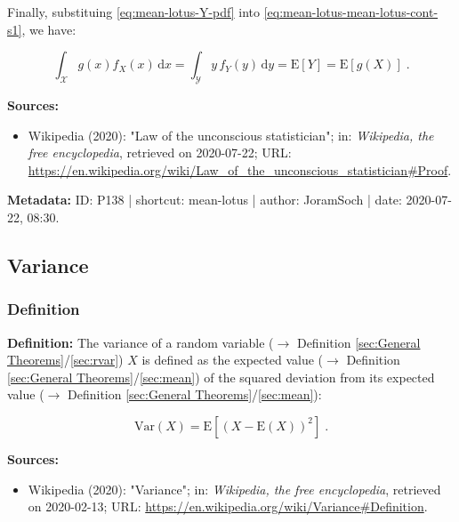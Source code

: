 \documentclass[a4paper,12pt,twoside]{book}
\begin{document}
Finally, substituing \eqref{eq:mean-lotus-Y-pdf} into \eqref{eq:mean-lotus-mean-lotus-cont-s1}, we have:

\begin{equation} \label{eq:mean-lotus-mean-lotus-cont-s2}
\int_{\mathcal{X}} g(x) f_X(x) \, \mathrm{d}x = \int_{\mathcal{Y}} y \, f_Y(y) \, \mathrm{d}y = \mathrm{E}[Y] = \mathrm{E}[g(X)] \; .
\end{equation}


\vspace{1em}
\textbf{Sources:}
\begin{itemize}
\item Wikipedia (2020): "Law of the unconscious statistician"; in: \textit{Wikipedia, the free encyclopedia}, retrieved on 2020-07-22; URL: \url{https://en.wikipedia.org/wiki/Law_of_the_unconscious_statistician#Proof}.
\end{itemize}


\vspace{1em}
\textbf{Metadata:} ID: P138 | shortcut: mean-lotus | author: JoramSoch | date: 2020-07-22, 08:30.
\vspace{1em}



\subsection{Variance}

\subsubsection[\textit{Definition}]{Definition} \label{sec:var}
\setcounter{equation}{0}

\textbf{Definition:} The variance of a random variable ($\rightarrow$ Definition \ref{sec:General Theorems}/\ref{sec:rvar}) $X$ is defined as the expected value ($\rightarrow$ Definition \ref{sec:General Theorems}/\ref{sec:mean}) of the squared deviation from its expected value ($\rightarrow$ Definition \ref{sec:General Theorems}/\ref{sec:mean}):

\begin{equation} \label{eq:var-var}
\mathrm{Var}(X) = \mathrm{E}\left[ (X-\mathrm{E}(X))^2 \right] \; .
\end{equation}


\vspace{1em}
\textbf{Sources:}
\begin{itemize}
\item Wikipedia (2020): "Variance"; in: \textit{Wikipedia, the free encyclopedia}, retrieved on 2020-02-13; URL: \url{https://en.wikipedia.org/wiki/Variance#Definition}.
\end{itemize}
\end{document}
